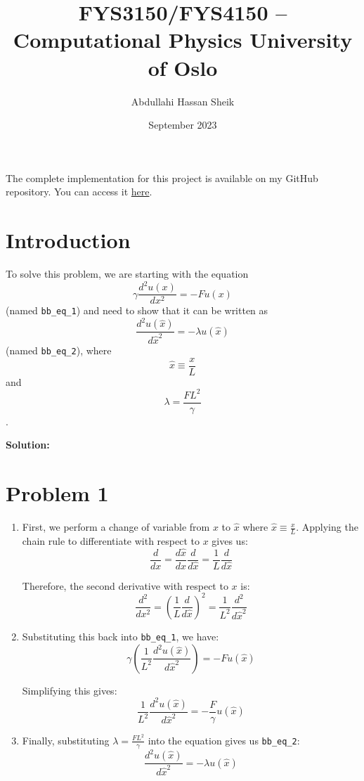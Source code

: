 \documentclass{article}
\title{FYS3150/FYS4150 – Computational Physics University of Oslo}
\author{Abdullahi Hassan Sheik}
\date{September 2023}
\begin{document}
\maketitle

\paragraph{}
The complete implementation for this project is available on my GitHub repository. You can access it \href{https://github.com/SheikAbdullahi/FYS4150Computational-Physics}{here}.

\section{Introduction}

To solve this problem, we are starting with the equation 
\[ \gamma \frac{d^2 u(x)}{dx^2} = - F u(x) \] 
(named \texttt{bb\_eq\_1}) and need to show that it can be written as 
\[ \frac{d^2 u(\hat{x})}{d\hat{x}^2} = - \lambda u(\hat{x}) \] 
(named \texttt{bb\_eq\_2}), where 
\[ \hat{x} \equiv \frac{x}{L} \] 
and 
\[ \lambda = \frac{F L^2}{\gamma} \].

\textbf{Solution:}

\section*{Problem 1}
\begin{enumerate}
    \item First, we perform a change of variable from $x$ to $\hat{x}$ where $\hat{x} \equiv \frac{x}{L}$. Applying the chain rule to differentiate with respect to $x$ gives us:
    \[ \frac{d}{dx} = \frac{d\hat{x}}{dx} \frac{d}{d\hat{x}} = \frac{1}{L} \frac{d}{d\hat{x}} \]
    
    Therefore, the second derivative with respect to $x$ is:
    \[ \frac{d^2}{dx^2} = \left( \frac{1}{L} \frac{d}{d\hat{x}} \right)^2 = \frac{1}{L^2} \frac{d^2}{d\hat{x}^2} \]
    
    \item Substituting this back into \texttt{bb\_eq\_1}, we have:
    \[ \gamma \left( \frac{1}{L^2} \frac{d^2 u(\hat{x})}{d\hat{x}^2} \right) = - F u(\hat{x}) \]
    
    Simplifying this gives:
    \[ \frac{1}{L^2} \frac{d^2 u(\hat{x})}{d\hat{x}^2} = - \frac{F}{\gamma} u(\hat{x}) \]
    
    \item Finally, substituting $\lambda = \frac{F L^2}{\gamma}$ into the equation gives us \texttt{bb\_eq\_2}:
    \[ \frac{d^2 u(\hat{x})}{d\hat{x}^2} = - \lambda u(\hat{x}) \]
\end{enumerate}
\end{document}
